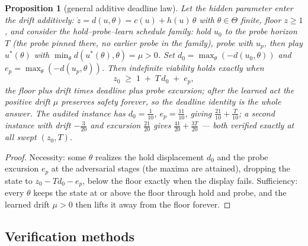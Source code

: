 \documentclass[10pt,twocolumn]{article}
\theoremstyle{plain}
\newtheorem{proposition}[theorem]{Proposition}
\theoremstyle{definition}
\theoremstyle{remark}
\begin{document}
\begin{proposition}[general additive deadline law]\label{prop:additivelaw}
Let the hidden parameter enter the drift additively:
\(\dot z = d(u, \theta) = c(u) + h(u)\,\theta\) with
\(\theta \in \Theta\) finite, floor \(z \ge 1\), and consider the
hold--probe--learn schedule family: hold \(u_{0}\) to the probe horizon
\(T\) (the probe pinned there, no earlier probe in the family), probe
with \(u_{p}\), then play \(u^{*}(\theta)\) with
\(\min_{\theta} d(u^{*}(\theta), \theta) = \mu > 0\). Set
\(d_{0} = \max_{\theta}(-d(u_{0}, \theta))\) and
\(e_{p} = \max_{\theta}(-d(u_{p}, \theta))\). Then indefinite
viability holds exactly when
\[
z_{0} \;\ge\; 1 \;+\; T\, d_{0} \;+\; e_{p},
\]
the floor plus drift times deadline plus probe excursion; after the
learned act the positive drift \(\mu\) preserves safety forever, so
the deadline identity is the whole answer. The audited instance has
\(d_{0} = \tfrac1{10}\), \(e_{p} = \tfrac{11}{10}\), giving
\(\tfrac{21}{10} + \tfrac{T}{10}\); a second instance with drift
\(-\tfrac{3}{20}\) and excursion \(\tfrac{21}{20}\) gives
\(\tfrac{41}{20} + \tfrac{3T}{20}\) --- both verified exactly at all
swept \((z_{0}, T)\).
\end{proposition}

\begin{proof}
Necessity: some \(\theta\) realizes the hold displacement \(d_{0}\)
and the probe excursion \(e_{p}\) at the adversarial stages (the maxima
are attained), dropping the state to
\(z_{0} - T d_{0} - e_{p}\), below the floor exactly when the display
fails. Sufficiency: every \(\theta\) keeps the state at or above the
floor through hold and probe, and the learned drift \(\mu > 0\) then
lifts it away from the floor forever.
\end{proof}

\subsection{Verification methods}\label{methods}
\end{document}
